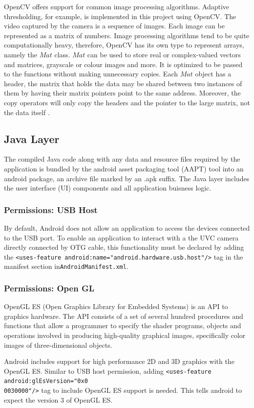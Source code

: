 OpenCV offers support for common image processing algorithms. Adaptive thresholding, for example, is implemented in this project using OpenCV. The video captured by the camera is a sequence of images. Each image can be represented as a matrix of numbers. Image processing algorithms tend to be quite computationally heavy, therefore, OpenCV has its own type to represent arrays, namely the $Mat$ class. $Mat$ can be used to store real or complex-valued vectors and matrices, grayscale or colour images and more. It is optimized to be passed to the functions without making unnecessary copies. Each $Mat$ object has a header, the matrix that holds the data may be shared between two instances of them by having their matrix pointers point to the same address. Moreover, the copy operators will only copy the headers and the pointer to the large matrix, not the data itself \parencite{openCv1}.


\subsection{Java Layer}


The compiled Java code along with any data and resource files required by the application is bundled by the android asset packaging tool (AAPT) tool into an android package, an archive file marked by an .apk suffix.
The Java layer includes the user interface (UI) components and all application buisness logic.

\subsubsection{Permissions: USB Host}
By default, Android does not allow an application to access the devices connected to the USB  port. To enable an application to interact with a the UVC camera directly connected by OTG cable, this functionality must be declared by adding the \texttt{<uses-feature android:name="android.hardware.usb.host"/>} tag in the manifest section in\texttt{AndroidManifest.xml}. 

\subsubsection{Permissions: Open GL}

OpenGL ES (Open Graphics Library for Embedded Systems) is an API to graphics hardware. The API consists of a set of several hundred procedures and functions that allow a programmer to specify the shader programs, objects and operations involved in producing high-quality graphical images, specifically color images of three-dimensional objects\parencite{openGl}.


Android includes support for high performance 2D and 3D graphics with the OpenGL ES. Similar to USB host permission, adding  \texttt{<uses-feature android:glEsVersion="0x0\\0030000"/>} tag to include OpenGL ES support is needed. This tells android to expect the version 3 of OpenGL ES.








 
